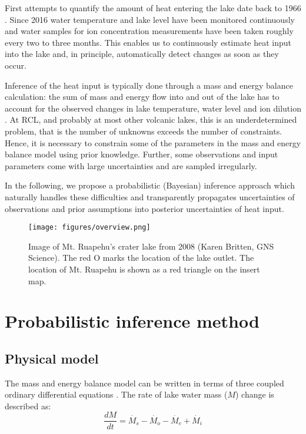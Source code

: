 \documentclass{bmcart}
\begin{document}
First attempts to quantify the amount of heat entering the lake date back to
1966 \citep{Dibble1966}. Since 2016 water temperature and lake level have been
monitored continuously and water samples for ion concentration measurements have
been taken roughly every two to three months. This enables us to continuously
estimate heat input into the lake and, in principle, automatically detect
changes as soon as they occur.

Inference of the heat input is typically done through a mass and energy balance
calculation: the sum of mass and energy flow into and out of the lake has to
account for the observed changes in lake temperature, water level and ion
dilution \cite{Hurst1981, Hurst1991, Stevenson1992, Fournier2009, Scott1994}. At
RCL, and probably at most other volcanic lakes, this is an underdetermined
problem, that is the number of unknowns exceeds the number of constraints.
Hence, it is necessary to constrain some of the parameters in the mass and
energy balance model using prior knowledge. Further, some observations and input
parameters come with large uncertainties and are sampled irregularly.

In the following, we propose a probabilistic (Bayesian) inference approach which
naturally handles these difficulties and transparently propagates uncertainties of
observations and prior assumptions into posterior uncertainties of heat input.

\begin{figure}
\texttt{[image: figures/overview.png]}  
\caption{Image of Mt. Ruapehu's crater lake from 2008 (\textcopyright Karen
	Britten, GNS Science). The red O marks the location of the lake outlet. The
	location of Mt. Ruapehu is shown as a red triangle on the insert map.}
  \label{overview}
\end{figure}


\section{Probabilistic inference method}\label{Pim}

\subsection{Physical model}\label{phm}

The mass and energy balance model can be written in terms of three coupled ordinary
differential equations \cite{Hurst1991, Stevenson1992}. The rate of lake water
mass ($M$) change is described as:
\begin{equation}\label{ode_M}
	\frac{dM}{dt} = \dot{M_s} - \dot{M_o} - \dot{M_e} + \dot{M_i}
\end{equation}
\end{document}
